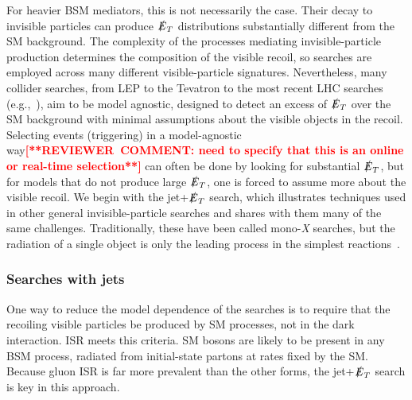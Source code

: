 \documentclass{ar-1col}
\newcommand{\IP}{invisible particle}
\newcommand{\MET}{\ensuremath{\slashed{E}_T}\xspace}
\begin{document}
For heavier BSM mediators, this is not necessarily the case. Their
decay to {\IP}s can produce \MET distributions substantially
different from the SM background. The complexity of the processes
mediating invisible-particle production determines the composition
of the visible recoil, so searches are employed across many
different visible-particle signatures. Nevertheless, many collider
searches, from LEP to the Tevatron to the most recent LHC searches
(e.g.,~), aim to be model agnostic,
designed to detect an excess of \MET over the SM background with
minimal assumptions about the visible objects in the recoil.
Selecting events (triggering) in a model-agnostic way\textbf{\textcolor{red}{[**REVIEWER\ COMMENT: need to specify that this is an online or real-time selection**]}} can often be
done by looking for substantial \MET, but for models that do not
produce large \MET, one is forced to assume more about the visible
recoil. We begin with the jet+\MET search, which illustrates
techniques used in other general invisible-particle searches and
shares with them many of the same challenges. Traditionally, these
have been called mono-\textit{X} searches, but the radiation of a single
object is only the leading process in the simplest
reactions~\cite{Haisch:2013ata}.

\begin{marginnote}[]
\end{marginnote}

\subsubsection{Searches with jets}

One way to reduce the model dependence of the searches is to
require that the recoiling visible particles be produced by SM
processes, not in the dark interaction. ISR meets this criteria.
SM bosons are likely to be present in any BSM process, radiated
from initial-state partons at rates fixed by the SM. Because gluon
ISR is far more prevalent than the other forms, the jet+\MET
search is key in this approach.
\end{document}
